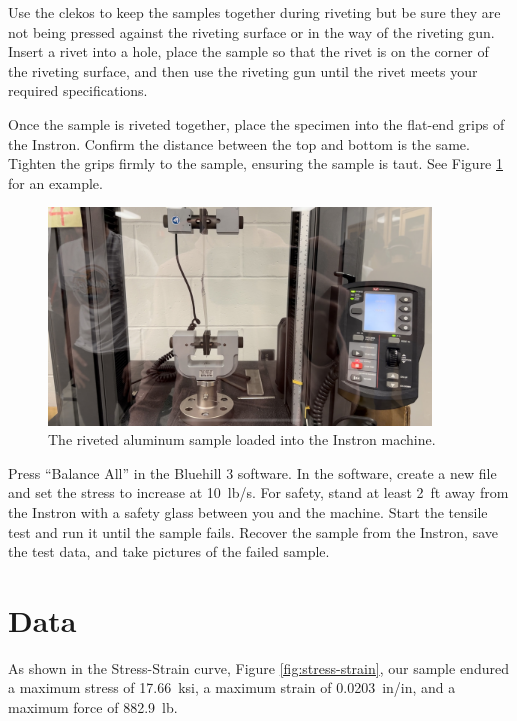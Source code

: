 \documentclass[12 pt]{article}
\begin{document}
Use the clekos to keep the samples together during riveting but be sure they are not being pressed against the riveting surface or in the way of the riveting gun. Insert a rivet into a hole, place the sample so that the rivet is on the corner of the riveting surface, and then use the riveting gun until the rivet meets your required specifications.

Once the sample is riveted together, place the specimen into the flat-end grips of the Instron. Confirm the distance between the top and bottom is the same. Tighten the grips firmly to the sample, ensuring the sample is taut. See Figure \ref{fig:loaded-sample} for an example.

\begin{figure}[htbp]
\centering
\includegraphics[width=4in]{images/loaded-sample}
\caption{The riveted aluminum sample loaded into the Instron machine.}
\label{fig:loaded-sample}
\end{figure}

Press ``Balance All'' in the Bluehill 3 software. In the software, create a new file and set the stress to increase at \qty{10}{lb/\s}. For safety, stand at least \qty{2}{ft} away from the Instron with a safety glass between you and the machine. Start the tensile test and run it until the sample fails. Recover the sample from the Instron, save the test data, and take pictures of the failed sample.

\section{Data} \label{data}
As shown in the Stress-Strain curve, Figure \ref{fig:stress-strain}, our sample endured a maximum stress of \qty{17.66}{ksi}, a maximum strain of \qty{0.0203}{in/in}, and a maximum force of \qty{882.9}{lb}.
\end{document}
